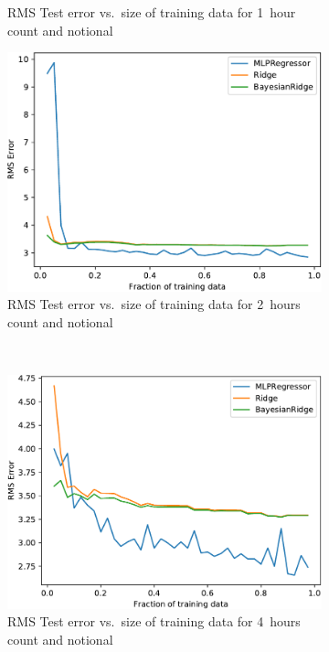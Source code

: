 \begin{figure}[!ht]
\begin{subfigure}[t]{.47\linewidth}
        \caption{RMS Test error vs.~size of training data for 1~hour count and notional}\label{AppAplotC5}
    \end{subfigure}\hfill%
    \begin{subfigure}[t]{.47\linewidth}\centering
        \includegraphics[width=0.9\linewidth]{./figures/AplotC6.pdf}
        \caption{RMS Test error vs.~size of training data for 2~hours count and notional}\label{AppAplotC6}
    \end{subfigure}\\[5pt]
    \begin{subfigure}[t]{.47\linewidth}\centering
        \includegraphics[width=0.9\linewidth]{./figures/AplotC7.pdf}
        \caption{RMS Test error vs.~size of training data for 4~hours count and notional}\label{AppAplotC7}
    \end{subfigure}\hfill%
    \begin{subfigure}[t]{.47\linewidth}\centering

\end{subfigure}
\end{figure}
